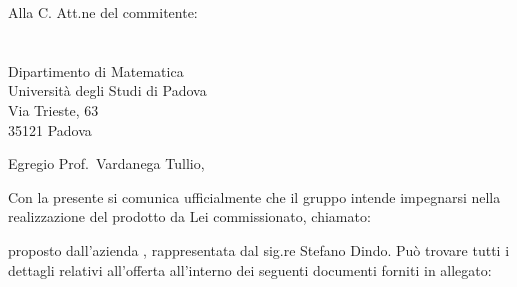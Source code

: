 \documentclass[a4paper,12pt]{letteracdp}
\date{2017-01-11}
\begin{document}
  \begin{letter}{
    Alla C. Att.ne del commitente: \\
    \COMMITTENTE \\
    \CARDIN      \\
    Dipartimento di Matematica \\
		Università degli Studi di Padova \\
		Via Trieste, 63 \\
		35121 Padova}
		
    \opening{Egregio Prof.~Vardanega Tullio,}
    Con la presente si comunica ufficialmente che il gruppo intende impegnarsi
    nella realizzazione del prodotto da Lei commissionato, chiamato:
    \begin{center}
      \CAPITOLATO
    \end{center}
    proposto dall'azienda \PROPONENTE{}, rappresentata dal sig.re Stefano Dindo.
    Può trovare tutti i dettagli relativi all'offerta all'interno dei seguenti
    documenti forniti in allegato:


\end{letter}
\end{document}
